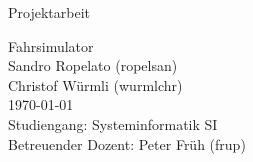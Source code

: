 %
%

\begin{titlepage}
\vspace{4em}
\center

\Large{\textsf{Projektarbeit}}
\vspace{1em}

\Huge{\textsf{Fahrsimulator}}
\vspace{2em}
\\
\Large{
	\textsf{
		Sandro Ropelato (ropelsan)\\
		Christof Würmli (wurmlchr)\\
		\vspace{2em}
		\today\\
		\vspace{2em}
		Studiengang: Systeminformatik SI\\
		Betreuender Dozent: Peter Früh (frup)
	}
}

\end{titlepage}

